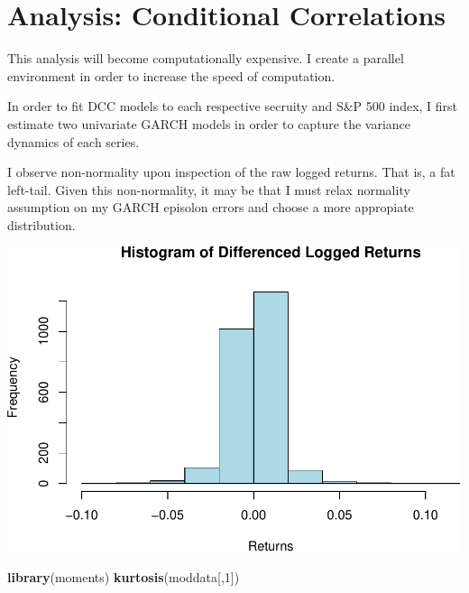 \documentclass[]{elsarticle} %
\makeatletter
\newenvironment{Shaded}{\begin{snugshade}}{\end{snugshade}}
\newcommand{\KeywordTok}[1]{\textcolor[rgb]{0.13,0.29,0.53}{\textbf{{#1}}}}
\newcommand{\DataTypeTok}[1]{\textcolor[rgb]{0.13,0.29,0.53}{{#1}}}
\newcommand{\DecValTok}[1]{\textcolor[rgb]{0.00,0.00,0.81}{{#1}}}
\newcommand{\StringTok}[1]{\textcolor[rgb]{0.31,0.60,0.02}{{#1}}}
\newcommand{\NormalTok}[1]{{#1}}
\def\maxwidth{\ifdim\Gin@nat@width>\linewidth\linewidth
\else\Gin@nat@width\fi}
\let\Oldincludegraphics\includegraphics
\renewcommand{\includegraphics}[1]{\Oldincludegraphics[width=\maxwidth]{#1}}
\makeatother
\begin{document}
\section{Analysis: Conditional
Correlations}\label{analysis-conditional-correlations}

This analysis will become computationally expensive. I create a parallel
environment in order to increase the speed of computation.

\begin{Shaded}
\end{Shaded}

In order to fit DCC models to each respective secruity and S\&P 500
index, I first estimate two univariate GARCH models in order to capture
the variance dynamics of each series.

I observe non-normality upon inspection of the raw logged returns. That
is, a fat left-tail. Given this non-normality, it may be that I must
relax normality assumption on my GARCH episolon errors and choose a more
appropiate distribution.

\includegraphics{report_files/figure-latex/analysis11-1.pdf}

\begin{Shaded}
\begin{Highlighting}[]
\KeywordTok{library}\NormalTok{(moments)}
\KeywordTok{kurtosis}\NormalTok{(moddata[,}\DecValTok{1}\NormalTok{])}
\end{Highlighting}
\end{Shaded}
\end{document}
